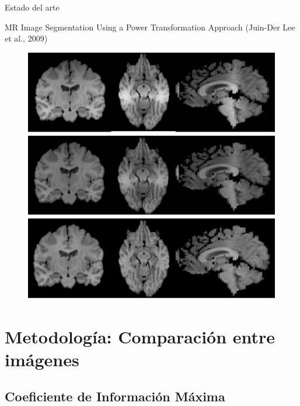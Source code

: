 \documentclass{beamer}
\begin{document}
\begin{frame}{Estado del arte}
    \pause
        \begin{block}{MR Image Segmentation Using a Power Transformation Approach (Juin-Der Lee et al., 2009) \cite{juin2009} }
        \begin{figure}
            \centering
            \includegraphics[scale=0.6]{papermri1.png}
            \label{fig:my_label}
        \end{figure}
    \end{block}
\end{frame}


\section{Metodología: Comparación entre imágenes}
\subsection{Coeficiente de Información Máxima}
\end{document}

